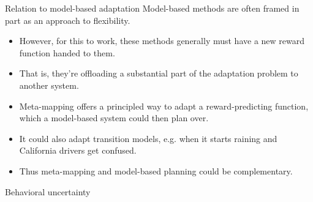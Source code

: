 \documentclass{beamer}
\begin{document}
\begin{frame}{Relation to model-based adaptation}
Model-based methods are often framed in part as an approach to flexibility.
\begin{itemize}
\item However, for this to work, these methods generally must have a new reward function handed to them.
\item That is, they're offloading a substantial part of the adaptation problem to another system.
\item Meta-mapping offers a principled way to adapt a reward-predicting function, which a model-based system could then plan over.
\item It could also adapt transition models, e.g. when it starts raining and California drivers get confused. 
\item Thus meta-mapping and model-based planning could be complementary.
\end{itemize}
\end{frame}

\begin{frame}{Behavioral uncertainty}
%
\end{frame}
\end{document}

